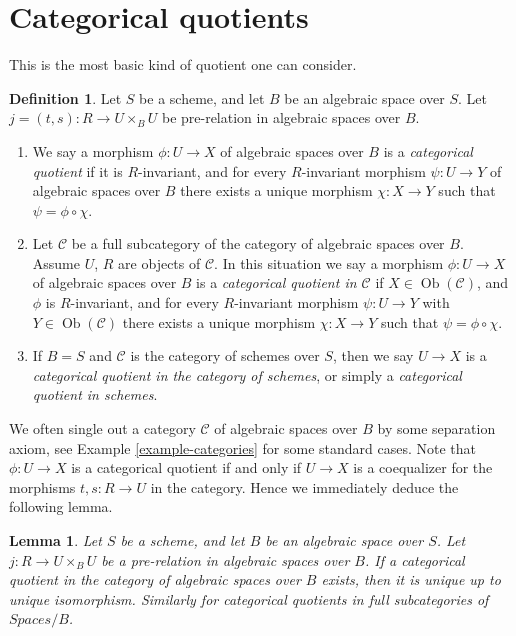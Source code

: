 \documentclass{stacks-project}
\theoremstyle{plain}
\newtheorem{lemma}[subsection]{Lemma}
\theoremstyle{definition}
\newtheorem{definition}[subsection]{Definition}
\theoremstyle{remark}
\numberwithin{equation}{subsection}
\def\Ob{\mathop{\mathrm{Ob}}\nolimits}
\begin{document}
\section{Categorical quotients}
\label{section-categorical}

\noindent
This is the most basic kind of quotient one can consider.

\begin{definition}
\label{definition-categorical}
Let $S$ be a scheme, and let $B$ be an algebraic space over $S$.
Let $j = (t, s) : R \to U \times_B U$ be pre-relation in algebraic spaces
over $B$.
\begin{enumerate}
\item We say a morphism $\phi : U \to X$ of algebraic spaces over $B$
is a {\it categorical quotient} if it is $R$-invariant, and
for every $R$-invariant morphism $\psi : U \to Y$ of algebraic spaces over $B$
there exists a unique morphism $\chi : X \to Y$ such that
$\psi = \phi \circ \chi$.
\item Let $\mathcal{C}$ be a full subcategory of the category of algebraic
spaces over $B$. Assume $U$, $R$ are objects of $\mathcal{C}$.
In this situation we say
a morphism $\phi : U \to X$ of algebraic spaces over $B$
is a {\it categorical quotient in $\mathcal{C}$}
if $X \in \Ob(\mathcal{C})$, and $\phi$ is $R$-invariant,
and for every $R$-invariant morphism
$\psi : U \to Y$ with $Y \in \Ob(\mathcal{C})$
there exists a unique morphism $\chi : X \to Y$ such
that $\psi = \phi \circ \chi$.
\item If $B = S$ and $\mathcal{C}$ is the category of schemes over $S$,
then we say $U \to X$ is a
{\it categorical quotient in the category of schemes}, or simply a
{\it categorical quotient in schemes}.
\end{enumerate}
\end{definition}

\noindent
We often single out a category $\mathcal{C}$ of algebraic spaces over $B$
by some separation axiom, see
Example \ref{example-categories}
for some standard cases.
Note that $\phi : U \to X$ is a categorical quotient if and only
if $U \to X$ is a coequalizer for the
morphisms $t, s : R \to U$ in the category. Hence we immediately
deduce the following lemma.

\begin{lemma}
\label{lemma-categorical-unique}
Let $S$ be a scheme, and let $B$ be an algebraic space over $S$.
Let $j : R \to U \times_B U$ be a pre-relation in algebraic spaces over $B$.
If a categorical quotient in the category of algebraic spaces
over $B$ exists, then it is unique up to unique isomorphism.
Similarly for categorical quotients in full subcategories of
$\textit{Spaces}/B$.
\end{lemma}
\end{document}
